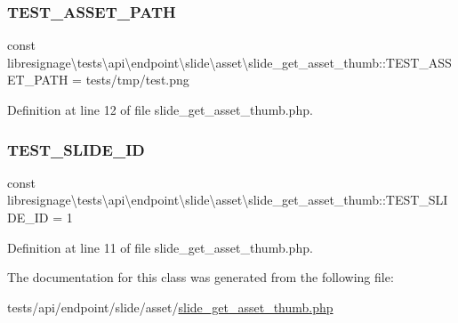\subsubsection{\texorpdfstring{T\+E\+S\+T\+\_\+\+A\+S\+S\+E\+T\+\_\+\+P\+A\+TH}{TEST\_ASSET\_PATH}}
{\footnotesize\ttfamily const libresignage\textbackslash{}tests\textbackslash{}api\textbackslash{}endpoint\textbackslash{}slide\textbackslash{}asset\textbackslash{}slide\+\_\+get\+\_\+asset\+\_\+thumb\+::\+T\+E\+S\+T\+\_\+\+A\+S\+S\+E\+T\+\_\+\+P\+A\+TH = \textquotesingle{}tests/tmp/test.\+png\textquotesingle{}}



Definition at line 12 of file slide\+\_\+get\+\_\+asset\+\_\+thumb.\+php.

\mbox{\label{classlibresignage_1_1tests_1_1api_1_1endpoint_1_1slide_1_1asset_1_1slide__get__asset__thumb_aa51a6a5e955e2cf1f8b9b914464cd7a9}} 
\subsubsection{\texorpdfstring{T\+E\+S\+T\+\_\+\+S\+L\+I\+D\+E\+\_\+\+ID}{TEST\_SLIDE\_ID}}
{\footnotesize\ttfamily const libresignage\textbackslash{}tests\textbackslash{}api\textbackslash{}endpoint\textbackslash{}slide\textbackslash{}asset\textbackslash{}slide\+\_\+get\+\_\+asset\+\_\+thumb\+::\+T\+E\+S\+T\+\_\+\+S\+L\+I\+D\+E\+\_\+\+ID = \textquotesingle{}1\textquotesingle{}}



Definition at line 11 of file slide\+\_\+get\+\_\+asset\+\_\+thumb.\+php.



The documentation for this class was generated from the following file\+:\begin{DoxyCompactItemize}
\item 
tests/api/endpoint/slide/asset/\hyperlink{tests_2api_2endpoint_2slide_2asset_2slide__get__asset__thumb_8php}{slide\+\_\+get\+\_\+asset\+\_\+thumb.\+php}\end{DoxyCompactItemize}
